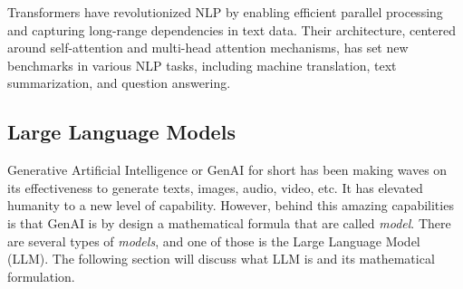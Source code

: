 Transformers have revolutionized NLP by enabling efficient parallel processing and capturing long-range dependencies in text data. Their architecture, centered around self-attention and multi-head attention mechanisms, has set new benchmarks in various NLP tasks, including machine translation, text summarization, and question answering.

\subsection{Large Language Models}\label{sec:llm_method}
Generative Artificial Intelligence or GenAI for short has been making waves on its effectiveness to generate texts, images, audio, video, etc. It has elevated humanity to a new level of capability. However, behind this amazing capabilities is that GenAI is by design a mathematical formula that are called \textit{model}. There are several types of \textit{models}, and one of those is the Large Language Model (LLM). The following section will discuss what LLM is and its mathematical formulation.
